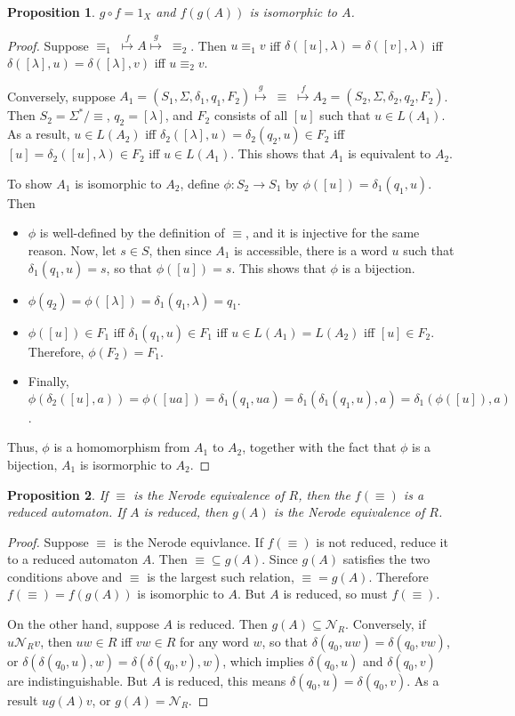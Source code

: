 \documentclass[12pt]{article}
\newtheorem{prop}{Proposition}
\begin{document}
\begin{prop} $g\circ f=1_X$ and $f(g(A))$ is isomorphic to $A$.  \end{prop}
\begin{proof}  Suppose $\equiv_1 \; \stackrel{f}{\mapsto} A \stackrel{g}{\mapsto} \; \equiv_2$.  Then $u \equiv_1 v$ iff $\delta([u],\lambda)=\delta([v],\lambda)$ iff $\delta([\lambda],u) = \delta([\lambda],v)$ iff $u\equiv_2 v$.

Conversely, suppose $A_1=(S_1,\Sigma,\delta_1,q_1,F_2) \stackrel{g}{\mapsto} \; \equiv \; \stackrel{f}{\mapsto} A_2=(S_2,\Sigma,\delta_2,q_2,F_2)$.  Then $S_2=\Sigma^*/\equiv$, $q_2=[\lambda]$, and $F_2$ consists of all $[u]$ such that $u\in L(A_1)$.  As a result, $u\in L(A_2)$ iff $\delta_2([\lambda],u)=\delta_2(q_2,u)\in F_2$ iff $[u]=\delta_2([u],\lambda)\in F_2$ iff $u\in L(A_1)$.  This shows that $A_1$ is equivalent to $A_2$.

To show $A_1$ is isomorphic to $A_2$, define $\phi:S_2\to S_1$ by $\phi([u])=\delta_1(q_1,u)$.  Then 
\begin{itemize}
\item $\phi$ is well-defined by the definition of $\equiv$, and it is injective for the same reason.  Now, let $s\in S$, then since $A_1$ is accessible, there is a word $u$ such that $\delta_1(q_1,u)=s$, so that $\phi([u])=s$.  This shows that $\phi$ is a bijection.
\item $\phi(q_2)=\phi([\lambda])=\delta_1(q_1,\lambda)=q_1$.
\item $\phi([u]) \in F_1$ iff $\delta_1(q_1,u)\in F_1$ iff $u\in L(A_1)=L(A_2)$ iff $[u]\in F_2$.  Therefore, $\phi(F_2)=F_1$.
\item Finally, $\phi(\delta_2([u],a))=\phi([ua])=\delta_1(q_1,ua)=\delta_1(\delta_1(q_1,u),a)=\delta_1(\phi([u]),a)$. 
\end{itemize}
Thus, $\phi$ is a homomorphism from $A_1$ to $A_2$, together with the fact that $\phi$ is a bijection, $A_1$ is isormorphic to $A_2$.
\end{proof}

\begin{prop} If $\equiv$ is the Nerode equivalence of $R$, then the $f(\equiv)$ is a reduced automaton.  If $A$ is reduced, then $g(A)$ is the Nerode equivalence of $R$.  \end{prop}
\begin{proof}  Suppose $\equiv$ is the Nerode equivlance.  If $f(\equiv)$ is not reduced, reduce it to a reduced automaton $A$.  Then $\equiv \subseteq g(A)$.  Since $g(A)$ satisfies the two conditions above and $\equiv$ is the largest such relation, $\equiv = g(A)$.  Therefore $f(\equiv)=f(g(A))$ is isomorphic to $A$.  But $A$ is reduced, so must $f(\equiv)$.

On the other hand, suppose $A$ is reduced.  Then $g(A) \subseteq \mathcal{N}_R$.  Conversely, if $u \mathcal{N}_R v$, then $uw\in R$ iff $vw\in R$ for any word $w$, so that $\delta(q_0,uw)=\delta(q_0,vw)$, or $\delta(\delta(q_0,u),w)=\delta(\delta(q_0,v),w)$, which implies $\delta(q_0,u)$ and $\delta(q_0,v)$ are indistinguishable.  But $A$ is reduced, this means $\delta(q_0,u) = \delta(q_0,v)$.  As a result $u g(A) v$, or $g(A) = \mathcal{N}_R$.
\end{proof}
\end{document}
